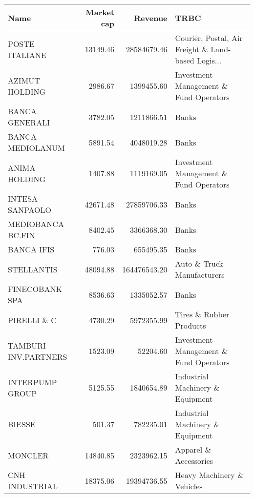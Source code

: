 \begin{tabular}{lrrl}
\toprule
                  Name &  Market cap &      Revenue &                                               TRBC \\
\midrule
        POSTE ITALIANE &    13149.46 &  28584679.46 & Courier, Postal, Air Freight \& Land-based Logis... \\
        AZIMUT HOLDING &     2986.67 &   1399455.60 &             Investment Management \& Fund Operators \\
        BANCA GENERALI &     3782.05 &   1211866.51 &                                              Banks \\
      BANCA MEDIOLANUM &     5891.54 &   4048019.28 &                                              Banks \\
         ANIMA HOLDING &     1407.88 &   1119169.05 &             Investment Management \& Fund Operators \\
       INTESA SANPAOLO &    42671.48 &  27859706.33 &                                              Banks \\
     MEDIOBANCA BC.FIN &     8402.45 &   3366368.30 &                                              Banks \\
            BANCA IFIS &      776.03 &    655495.35 &                                              Banks \\
            STELLANTIS &    48094.88 & 164476543.20 &                         Auto \& Truck Manufacturers \\
        FINECOBANK SPA &     8536.63 &   1335052.57 &                                              Banks \\
           PIRELLI \& C &     4730.29 &   5972355.99 &                            Tires \& Rubber Products \\
  TAMBURI INV.PARTNERS &     1523.09 &     52204.60 &             Investment Management \& Fund Operators \\
       INTERPUMP GROUP &     5125.55 &   1840654.89 &                   Industrial Machinery \& Equipment \\
                BIESSE &      501.37 &    782235.01 &                   Industrial Machinery \& Equipment \\
               MONCLER &    14840.85 &   2323962.15 &                              Apparel \& Accessories \\
        CNH INDUSTRIAL &    18375.06 &  19394736.55 &                         Heavy Machinery \& Vehicles \\

\end{tabular}
